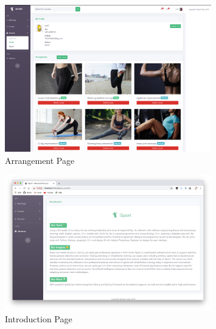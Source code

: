 \documentclass[16pt]{scrreprt}
\begin{document}
\begin{figure}[H]
	\centering
	\includegraphics[width=0.8\textwidth]{diagrams/arrange.png}
	\caption{Arrangement Page}
\end{figure}

\begin{figure}[H]
	\centering
	\includegraphics[width=0.8\textwidth]{diagrams/about-us.jpg}
	\caption{Introduction Page}
\end{figure}
\end{document}
